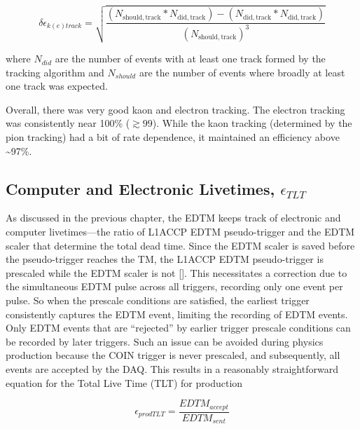 \documentclass[
]{report}
\begin{document}
\begin{equation} 
  \delta\epsilon_{k(e)track}=\sqrt{\frac{(N_{\mathrm{should,track}}*N_{\mathrm{did,track}})-(N_{\mathrm{did,track}}*N_{\mathrm{did,track}})}{(N_{\mathrm{should,track}})^3}}
  \label{eq:track_eff_error} 
\end{equation}

\noindent where \(N_{did}\) are the number of events with at least one
track formed by the tracking algorithm and \(N_{should}\) are the number
of events where broadly at least one track was expected.




Overall, there was very good kaon and electron tracking. The electron
tracking was consistently near 100\% (\(\gtrsim99%
\)). While the kaon tracking (determined by the pion tracking) had a bit
of rate dependence, it maintained an efficiency above
\textasciitilde97\%.

\hypertarget{computer-and-electronic-livetimes-epsilon_tlt}{%
\subsection{\texorpdfstring{Computer and Electronic Livetimes,
\(\epsilon_{TLT}\)}{Computer and Electronic Livetimes, \textbackslash epsilon\_\{TLT\}}}\label{computer-and-electronic-livetimes-epsilon_tlt}}

As discussed in the previous chapter, the EDTM keeps track of electronic
and computer livetimes---the ratio of L1ACCP EDTM pseudo-trigger and the
EDTM scaler that determine the total dead time. Since the EDTM scaler is
saved before the pseudo-trigger reaches the TM, the L1ACCP EDTM
pseudo-trigger is prescaled while the EDTM scaler is not
{[}\cite{murphy_edtm_2022}{]}. This necessitates a correction due to the
simultaneous EDTM pulse across all triggers, recording only one event
per pulse. So when the prescale conditions are satisfied, the earliest
trigger consistently captures the EDTM event, limiting the recording of
EDTM events. Only EDTM events that are ``rejected'' by earlier trigger
prescale conditions can be recorded by later triggers. Such an issue can
be avoided during physics production because the COIN trigger is never
prescaled, and subsequently, all events are accepted by the DAQ. This
results in a reasonably straightforward equation for the Total Live Time
(TLT) for production

\begin{equation} 
  \epsilon_{prodTLT}=\frac{EDTM_{accept}}{EDTM_{sent}}
  \label{eq:tlt_prod} 
\end{equation}
\end{document}
